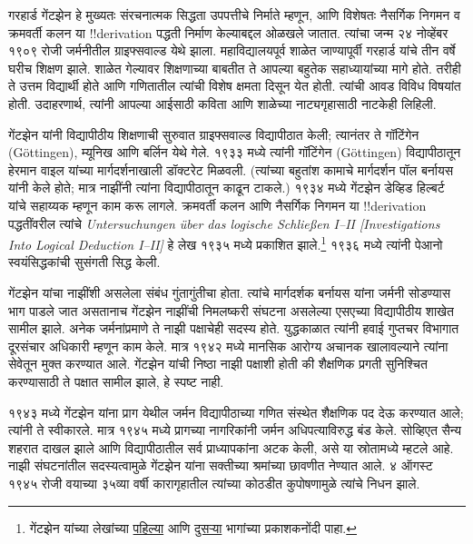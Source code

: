 \documentclass[../../../include/open-logic-section]{subfiles}
\begin{document}



गरहार्ड गेंटझेन हे मुख्यतः संरचनात्मक सिद्धता उपपत्तीचे निर्माते म्हणून, आणि विशेषतः नैसर्गिक निगमन व क्रमवर्ती कलन या !!{derivation} पद्धती निर्माण केल्याबद्दल ओळखले जातात. त्यांचा जन्म २४ नोव्हेंबर १९०९ रोजी जर्मनीतील ग्राइफ्सवाल्ड येथे झाला. महाविद्यालयपूर्व शाळेत जाण्यापूर्वी गरहार्ड यांचे तीन वर्षे घरीच शिक्षण झाले. शाळेत गेल्यावर शिक्षणाच्या बाबतीत ते आपल्या बहुतेक सहाध्यायांच्या मागे होते. तरीही ते उत्तम विद्यार्थी होते आणि गणितातील त्यांची विशेष क्षमता दिसून येत होती. त्यांची आवड विविध विषयांत होती. उदाहरणार्थ, त्यांनी आपल्या आईसाठी कविता आणि शाळेच्या नाट्यगृहासाठी नाटकेही लिहिली.

गेंटझेन यांनी विद्यापीठीय शिक्षणाची सुरुवात ग्राइफ्सवाल्ड विद्यापीठात केली; त्यानंतर ते गॉटिंगेन (G\"{o}ttingen), म्यूनिख आणि बर्लिन येथे गेले. १९३३ मध्ये त्यांनी गॉटिंगेन (G\"{o}ttingen) विद्यापीठातून हेरमान वाइल यांच्या मार्गदर्शनाखाली डॉक्टरेट मिळवली. (त्यांच्या बहुतांश कामाचे मार्गदर्शन पॉल बर्नायस यांनी केले होते; मात्र नाझींनी त्यांना विद्यापीठातून काढून टाकले.) १९३४ मध्ये गेंटझेन डेव्हिड हिल्बर्ट यांचे सहाय्यक म्हणून काम करू लागले. क्रमवर्ती कलन आणि नैसर्गिक निगमन या !!{derivation} पद्धतींवरील त्यांचे \emph{Untersuchungen \"{u}ber das logische Schlie\ss en I--II
  [Investigations Into Logical Deduction I--II]} हे लेख १९३५ मध्ये प्रकाशित झाले.\footnote{गेंटझेन यांच्या लेखांच्या \href{https://doi.org/10.1007/BF01201353}{पहिल्या} आणि \href{https://doi.org/10.1007/BF01201363}{दुसऱ्या} भागांच्या प्रकाशकनोंदी पाहा.} १९३६ मध्ये त्यांनी पेआनो स्वयंसिद्धकांची सुसंगती सिद्ध केली.

गेंटझेन यांचा नाझींशी असलेला संबंध गुंतागुंतीचा होता. त्यांचे मार्गदर्शक बर्नायस यांना जर्मनी सोडण्यास भाग पाडले जात असतानाच गेंटझेन नाझींची निमलष्करी संघटना असलेल्या एसएच्या विद्यापीठीय शाखेत सामील झाले. अनेक जर्मनांप्रमाणे ते नाझी पक्षाचेही सदस्य होते. युद्धकाळात त्यांनी हवाई गुप्तचर विभागात दूरसंचार अधिकारी म्हणून काम केले. मात्र १९४२ मध्ये मानसिक आरोग्य अचानक खालावल्याने त्यांना सेवेतून मुक्त करण्यात आले. गेंटझेन यांची निष्ठा नाझी पक्षाशी होती की शैक्षणिक प्रगती सुनिश्चित करण्यासाठी ते पक्षात सामील झाले, हे स्पष्ट नाही.

१९४३ मध्ये गेंटझेन यांना प्राग येथील जर्मन विद्यापीठाच्या गणित संस्थेत शैक्षणिक पद देऊ करण्यात आले; त्यांनी ते स्वीकारले. मात्र १९४५ मध्ये प्रागच्या नागरिकांनी जर्मन अधिपत्याविरुद्ध बंड केले. सोव्हिएत सैन्य शहरात दाखल झाले आणि विद्यापीठातील सर्व प्राध्यापकांना अटक केली, असे या स्रोतामध्ये म्हटले आहे. नाझी संघटनांतील सदस्यत्वामुळे गेंटझेन यांना सक्तीच्या श्रमांच्या छावणीत नेण्यात आले. ४ ऑगस्ट १९४५ रोजी वयाच्या ३५व्या वर्षी कारागृहातील त्यांच्या कोठडीत कुपोषणामुळे त्यांचे निधन झाले.
\end{document}
